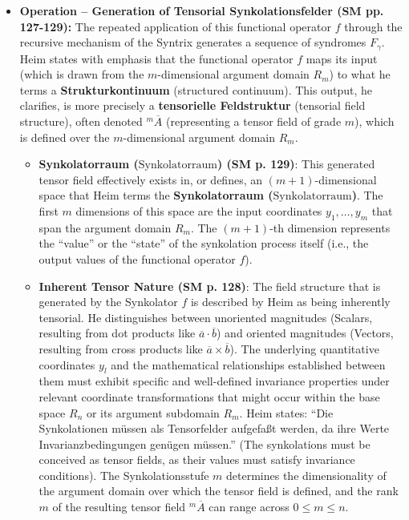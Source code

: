\documentclass[12pt]{article}
\newcommand{\q}[1]{\enquote{#1}}
\newcommand{\syndrom}{F}
\newcommand{\synkolatorraum}{\text{Synkolatorraum}}
\begin{document}
\begin{itemize}
    \item \textbf{Operation – Generation of Tensorial Synkolationsfelder (SM pp. 127-129):}
    The repeated application of this functional operator \( f \) through the recursive mechanism of the Syntrix generates a sequence of syndromes \( \syndrom_\gamma \). Heim states with emphasis that the functional operator \( f \) maps its input (which is drawn from the \( m \)-dimensional argument domain \( R_m \)) to what he terms a \textbf{Strukturkontinuum} (structured continuum). This output, he clarifies, is more precisely a \textbf{tensorielle Feldstruktur} (tensorial field structure), often denoted \( ^m\overline{A} \) (representing a tensor field of grade \( m \)), which is defined over the \( m \)-dimensional argument domain \( R_m \).
    \begin{itemize}
        \item \textbf{Synkolatorraum (\(\synkolatorraum\)) (SM p. 129)}: This generated tensor field effectively exists in, or defines, an \( (m+1) \)-dimensional space that Heim terms the \textbf{Synkolatorraum (\(\synkolatorraum\))}. The first \( m \) dimensions of this space are the input coordinates \(y_1, \dots, y_m\) that span the argument domain \( R_m \). The \( (m+1) \)-th dimension represents the \q{value} or the \q{state} of the synkolation process itself (i.e., the output values of the functional operator \( f \)).
        \item \textbf{Inherent Tensor Nature (SM p. 128)}: The field structure that is generated by the Synkolator \( f \) is described by Heim as being inherently tensorial. He distinguishes between unoriented magnitudes (Scalars, resulting from dot products like $\overline{a} \cdot \overline{b}$) and oriented magnitudes (Vectors, resulting from cross products like $\overline{a} \times \overline{b}$). The underlying quantitative coordinates \( y_l \) and the mathematical relationships established between them must exhibit specific and well-defined invariance properties under relevant coordinate transformations that might occur within the base space \( R_n \) or its argument subdomain \( R_m \). Heim states: \q{Die Synkolationen müssen als Tensorfelder aufgefaßt werden, da ihre Werte Invarianzbedingungen genügen müssen.} (The synkolations must be conceived as tensor fields, as their values must satisfy invariance conditions). The Synkolationsstufe \( m \) determines the dimensionality of the argument domain over which the tensor field is defined, and the rank \(m\) of the resulting tensor field \( ^m\overline{A} \) can range across $0 \le m \le n$.
    \end{itemize}


\end{itemize}
\end{document}
